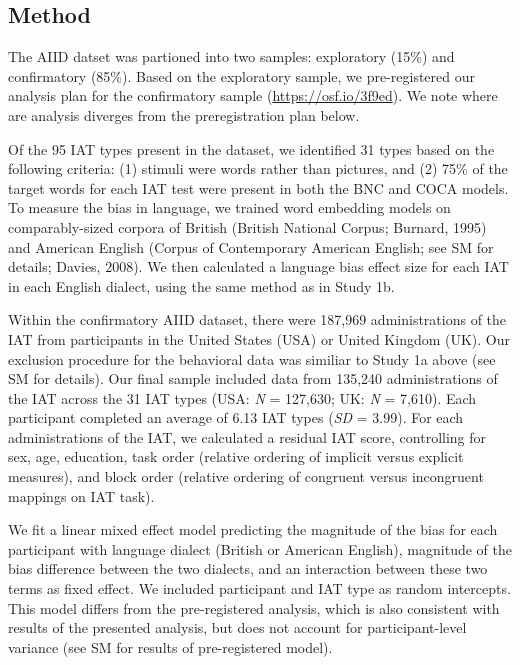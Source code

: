 \documentclass[man,floatsintext]{apa6}
\begin{document}
\hypertarget{method}{%
\subsection{Method}\label{method}}

The AIID datset was partioned into two samples: exploratory (15\%) and confirmatory (85\%). Based on the exploratory sample, we pre-registered our analysis plan for the confirmatory sample (\url{https://osf.io/3f9ed}). We note where are analysis diverges from the preregistration plan below.

Of the 95 IAT types present in the dataset, we identified 31 types based on the following criteria: (1) stimuli were words rather than pictures, and (2) 75\% of the target words for each IAT test were present in both the BNC and COCA models. To measure the bias in language, we trained word embedding models on comparably-sized corpora of British (British National Corpus; Burnard, 1995) and American English (Corpus of Contemporary American English; see SM for details; Davies, 2008). We then calculated a language bias effect size for each IAT in each English dialect, using the same method as in Study 1b.

Within the confirmatory AIID dataset, there were 187,969 administrations of the IAT from participants in the United States (USA) or United Kingdom (UK). Our exclusion procedure for the behavioral data was similiar to Study 1a above (see SM for details). Our final sample included data from 135,240 administrations of the IAT across the 31 IAT types (USA: \emph{N} = 127,630; UK: \emph{N} = 7,610). Each participant completed an average of 6.13 IAT types (\emph{SD} = 3.99). For each administrations of the IAT, we calculated a residual IAT score, controlling for sex, age, education, task order (relative ordering of implicit versus explicit measures), and block order (relative ordering of congruent versus incongruent mappings on IAT task).

We fit a linear mixed effect model predicting the magnitude of the bias for each participant with language dialect (British or American English), magnitude of the bias difference between the two dialects, and an interaction between these two terms as fixed effect. We included participant and IAT type as random intercepts. This model differs from the pre-registered analysis, which is also consistent with results of the presented analysis, but does not account for participant-level variance (see SM for results of pre-registered model).
\end{document}

